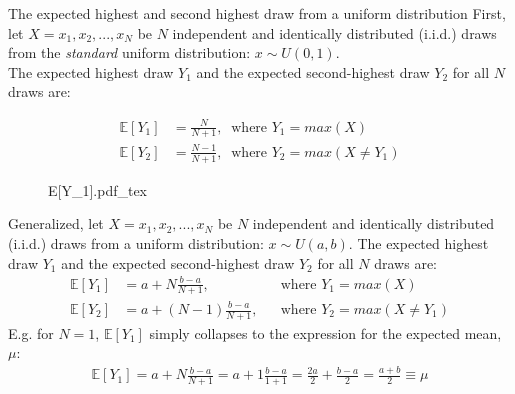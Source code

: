 \begin{frame}{The expected highest and second highest draw from a uniform distribution}
    First, let $X=x_1,x_2,...,x_N$ be $N$ independent and identically distributed (i.i.d.) draws from the \textit{standard} uniform distribution: $x\sim U(0, 1)$.\\\smallskip
    The expected highest draw $Y_1$ and the expected second-highest draw $Y_2$ for all $N$ draws are: \vspace{-16pt}
    \begin{multicols}{2}
      \begin{align*}
        \mathbb{E}[Y_1]&=\frac{N}{N+1},\ \text{ where }Y_1=max(X)\\
        \mathbb{E}[Y_2]&=\frac{N-1}{N+1},\ \text{ where }Y_2=max(X\neq Y_1)
      \end{align*}
      \vfill\null\columnbreak
      \begin{figure}[!h]
        \center
        \def\svgwidth{1.1\columnwidth}
        {E[Y_1].pdf_tex}
      \end{figure}
      \vfill\null
    \end{multicols} \vspace{-24pt}
    Generalized, let $X=x_1,x_2,...,x_N$ be $N$ independent and identically distributed (i.i.d.) draws from a uniform distribution: $x\sim U(a, b)$. The expected highest draw $Y_1$ and the expected second-highest draw $Y_2$ for all $N$ draws are: \vspace{-4pt}
    \begin{align*}
      \mathbb{E}[Y_1]&=a+N\frac{b-a}{N+1},&&\text{where }Y_1=max(X)\\
      \mathbb{E}[Y_2]&=a+(N-1)\frac{b-a}{N+1},&&\text{where }Y_2=max(X\neq Y_1)
    \end{align*}
    E.g. for $N=1$, $\mathbb{E}[Y_1]$ simply collapses to the expression for the expected mean, $\mu$:\vspace{-4pt}
    \begin{align*}
      \mathbb{E}[Y_1]=a+N\frac{b-a}{N+1}=a+1\frac{b-a}{1+1}=\frac{2a}{2}+\frac{b-a}{2}=\frac{a+b}{2}\equiv\mu
    \end{align*}
\end{frame}

